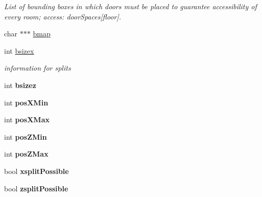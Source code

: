 \begin{DoxyCompactItemize}
\begin{DoxyCompactList}\small\item\em \-List of bounding boxes in which doors must be placed to guarantee accessibility of every room; access\-: door\-Spaces\mbox{[}floor\mbox{]}. \end{DoxyCompactList}\item 
char $\ast$$\ast$$\ast$ \hyperlink{structLevel_1_1Building_a684eaeadb756c94a6d81f1b6c3f27e84}{bmap}
\item 
\hypertarget{structLevel_1_1Building_ac1d9615b43944f9e17121a32e3cdf188}{
int \hyperlink{structLevel_1_1Building_ac1d9615b43944f9e17121a32e3cdf188}{bsizex}}
\label{db/da2/structLevel_1_1Building_ac1d9615b43944f9e17121a32e3cdf188}

\begin{DoxyCompactList}\small\item\em information for splits \end{DoxyCompactList}\item 
\hypertarget{structLevel_1_1Building_a02724f162415fb2af78a7e4a0bd8626d}{
int {\bfseries bsizez}}
\label{db/da2/structLevel_1_1Building_a02724f162415fb2af78a7e4a0bd8626d}

\item 
\hypertarget{structLevel_1_1Building_a3fd062700b1290b92a9028ffb21534c4}{
int {\bfseries pos\-X\-Min}}
\label{db/da2/structLevel_1_1Building_a3fd062700b1290b92a9028ffb21534c4}

\item 
\hypertarget{structLevel_1_1Building_a9fd92c3eb51dd8fdb55a7300e4083bc0}{
int {\bfseries pos\-X\-Max}}
\label{db/da2/structLevel_1_1Building_a9fd92c3eb51dd8fdb55a7300e4083bc0}

\item 
\hypertarget{structLevel_1_1Building_ae08be9b67d0cb16d97897f1bfad811ab}{
int {\bfseries pos\-Z\-Min}}
\label{db/da2/structLevel_1_1Building_ae08be9b67d0cb16d97897f1bfad811ab}

\item 
\hypertarget{structLevel_1_1Building_ab7430e8cdd35aab0a1b2d17d5d4fb22a}{
int {\bfseries pos\-Z\-Max}}
\label{db/da2/structLevel_1_1Building_ab7430e8cdd35aab0a1b2d17d5d4fb22a}

\item 
\hypertarget{structLevel_1_1Building_a569805f57ee1727b59210d339ab38d23}{
bool {\bfseries xsplit\-Possible}}
\label{db/da2/structLevel_1_1Building_a569805f57ee1727b59210d339ab38d23}

\item 
\hypertarget{structLevel_1_1Building_aa66d819f1a4e21310c0fcf012f02035d}{
bool {\bfseries zsplit\-Possible}}
\label{db/da2/structLevel_1_1Building_aa66d819f1a4e21310c0fcf012f02035d}


\end{DoxyCompactItemize}
